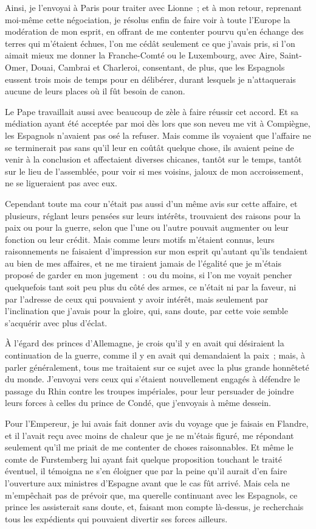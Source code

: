 \documentclass[french,twoside]{book} %
\begin{document}
Ainsi, je l’envoyai à Paris pour traiter avec Lionne ; et à mon retour, reprenant moi-même cette négociation, je résolus enfin de faire voir à toute l’Europe la modération de mon esprit, en offrant de me contenter pourvu qu’en échange des terres qui m’étaient échues, l’on me cédât seulement ce que j’avais pris, si l’on aimait mieux me donner la Franche-Comté ou le Luxembourg, avec Aire, Saint-Omer, Douai, Cambrai et Charleroi, consentant, de plus, que les Espagnols eussent trois mois de temps pour en délibérer, durant lesquels je n’attaquerais aucune de leurs places où il fût besoin de canon.\par
Le Pape travaillait aussi avec beaucoup de zèle à faire réussir cet accord. Et sa médiation ayant été acceptée par moi dès lors que son neveu me vit à Compiègne, les Espagnols n’avaient pas osé la refuser. Mais comme ils voyaient que l’affaire ne se terminerait pas sans qu’il leur en coûtât quelque chose, ils avaient peine de venir à la conclusion et affectaient diverses chicanes, tantôt sur le temps, tantôt sur le lieu de l’assemblée, pour voir si mes voisins, jaloux de mon accroissement, ne se ligueraient pas avec eux.\par
Cependant toute ma cour n’était pas aussi d’un même avis sur cette affaire, et plusieurs, réglant leurs pensées sur leurs intérêts, trouvaient des raisons pour la paix ou pour la guerre, selon que l’une ou l’autre pouvait augmenter ou leur fonction ou leur crédit. Mais comme leurs motifs m’étaient connus, leurs raisonnements ne faisaient d’impression sur mon esprit qu’autant qu’ils tendaient au bien de mes affaires, et ne me tiraient jamais de l’égalité que je m’étais proposé de garder en mon jugement : ou du moins, si l’on me voyait pencher quelquefois tant soit peu plus du côté des armes, ce n’était ni par la faveur, ni par l’adresse de ceux qui pouvaient y avoir intérêt, mais seulement par l’inclination que j’avais pour la gloire, qui, sans doute, par cette voie semble s’acquérir avec plus d’éclat.\par
À l’égard des princes d’Allemagne, je crois qu’il y en avait qui désiraient la continuation de la guerre, comme il y en avait qui demandaient la paix ; mais, à parler généralement, tous me traitaient sur ce sujet avec la plus grande honnêteté du monde. J’envoyai vers ceux qui s’étaient nouvellement engagés à défendre le passage du Rhin contre les troupes impériales, pour leur persuader de joindre leurs forces à celles du prince de Condé, que j’envoyais à même dessein.\par
Pour l’Empereur, je lui avais fait donner avis du voyage que je faisais en Flandre, et il l’avait reçu avec moins de chaleur que je ne m’étais figuré, me répondant seulement qu’il me priait de me contenter de choses raisonnables. Et même le comte de Furstemberg lui ayant fait quelque proposition touchant le traité éventuel, il témoigna ne s’en éloigner que par la peine qu’il aurait d’en faire l’ouverture aux ministres d’Espagne avant que le cas fût arrivé. Mais cela ne m’empêchait pas de prévoir que, ma querelle continuant avec les Espagnols, ce prince les assisterait sans doute, et, faisant mon compte là-dessus, je recherchais tous les expédients qui pouvaient divertir ses forces ailleurs.\par
\end{document}
